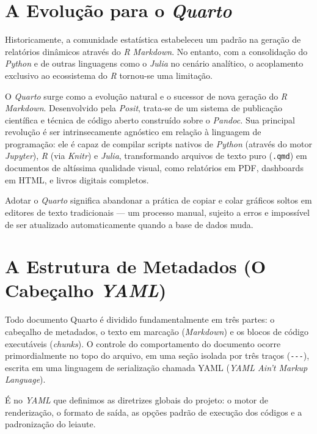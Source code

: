 \documentclass[
  brazilian,
  letterpaper,
  DIV=11,
  numbers=noendperiod]{scrreprt}
\begin{document}
\section{\texorpdfstring{A Evolução para o
\emph{Quarto}}{A Evolução para o Quarto}}\label{a-evoluuxe7uxe3o-para-o-quarto}

Historicamente, a comunidade estatística estabeleceu um padrão na
geração de relatórios dinâmicos através do \emph{R Markdown}. No
entanto, com a consolidação do \emph{Python} e de outras linguagens como
o \emph{Julia} no cenário analítico, o acoplamento exclusivo ao
ecossistema do \emph{R} tornou-se uma limitação.

O \emph{Quarto} surge como a evolução natural e o sucessor de nova
geração do \emph{R Markdown}. Desenvolvido pela \emph{Posit}, trata-se
de um sistema de publicação científica e técnica de código aberto
construído sobre o \emph{Pandoc.} Sua principal revolução é ser
intrinsecamente agnóstico em relação à linguagem de programação: ele é
capaz de compilar scripts nativos de \emph{Python} (através do motor
\emph{Jupyter}), \emph{R} (via \emph{Knitr}) e \emph{Julia},
transformando arquivos de texto puro (\texttt{.qmd}) em documentos de
altíssima qualidade visual, como relatórios em PDF, dashboards em HTML,
e livros digitais completos.

Adotar o \emph{Quarto} significa abandonar a prática de copiar e colar
gráficos soltos em editores de texto tradicionais --- um processo
manual, sujeito a erros e impossível de ser atualizado automaticamente
quando a base de dados muda.

\section{\texorpdfstring{A Estrutura de Metadados (O Cabeçalho
\emph{YAML})}{A Estrutura de Metadados (O Cabeçalho YAML)}}\label{a-estrutura-de-metadados-o-cabeuxe7alho-yaml}

Todo documento Quarto é dividido fundamentalmente em três partes: o
cabeçalho de metadados, o texto em marcação (\emph{Markdown}) e os
blocos de código executáveis (\emph{chunks}). O controle do
comportamento do documento ocorre primordialmente no topo do arquivo, em
uma seção isolada por três traços (\texttt{-\/-\/-}), escrita em uma
linguagem de serialização chamada YAML (\emph{YAML Ain't Markup
Language}).

É no \emph{YAML} que definimos as diretrizes globais do projeto: o motor
de renderização, o formato de saída, as opções padrão de execução dos
códigos e a padronização do leiaute.
\end{document}
